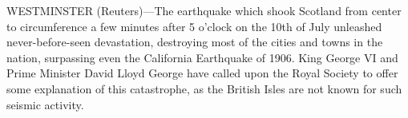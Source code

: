 \documentclass{newspaper1920}
\def\minipageheight{37}
\begin{document}
\begin{multicols}{3}




\halfrule



\halfrule



\halfrule



\halfrule



\halfrule



\fullrule



\halfrule



\halfrule



\columnbreak

\noindent
\begin{minipage}[t][\minipageheight\baselineskip]{2\columnwidth+1\columnsep}
\fancyrule
\vspace{-\baselineskip}
\vspace{-0.5\baselineskip}
\begin{multicols}{2}
WESTMINSTER (Reuters)---The earthquake which shook Scotland from
center to circumference a few minutes after 5 o'clock on the 10th of
July unleashed never-before-seen devastation, destroying most of the
cities and towns in the nation, surpassing even the California
Earthquake of 1906.  King George VI and Prime Minister David Lloyd
George have called upon the Royal Society to offer some explanation of
this catastrophe, as the British Isles are not known for such seismic
activity.


\end{multicols}
\end{minipage}
\end{multicols}
\end{document}
